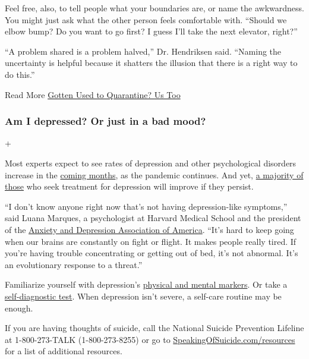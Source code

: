 Feel free, also, to tell people what your boundaries are, or name the
awkwardness. You might just ask what the other person feels comfortable
with. ``Should we elbow bump? Do you want to go first? I guess I'll take
the next elevator, right?''

``A problem shared is a problem halved,'' Dr. Hendriksen said. ``Naming
the uncertainty is helpful because it shatters the illusion that there
is a right way to do this.''

 Read More
\href{https://www.nytimes3xbfgragh.onion/2020/06/27/at-home/manage-your-coronavirus-anxiety.html}{Gotten
Used to Quarantine? Us Too}

\hypertarget{am-i-depressed-or-just-in-a-bad-mood}{%
\subsubsection{Am I depressed? Or just in a bad
mood?}\label{am-i-depressed-or-just-in-a-bad-mood}}

+

Most experts expect to see rates of depression and other psychological
disorders increase in the
\href{https://www.nytimes3xbfgragh.onion/2020/04/18/health/coronavirus-america-future.html}{coming
months}, as the pandemic continues. And yet,
\href{https://www.sciencedaily.com/releases/2015/03/150311160240.htm}{a
majority of those} who seek treatment for depression will improve if
they persist.

``I don't know anyone right now that's not having depression-like
symptoms,'' said Luana Marques, a psychologist at Harvard Medical School
and the president of the \href{https://adaa.org/}{Anxiety and Depression
Association of America}. ``It's hard to keep going when our brains are
constantly on fight or flight. It makes people really tired. If you're
having trouble concentrating or getting out of bed, it's not abnormal.
It's an evolutionary response to a threat.''

Familiarize yourself with depression's
\href{https://www.mayoclinic.org/diseases-conditions/depression/expert-answers/clinical-depression/faq-20057770}{physical
and mental markers}. Or take a
\href{https://www.med.umich.edu/1info/FHP/practiceguides/depress/phq-9.pdf}{self-diagnostic
test}. When depression isn't severe, a self-care routine may be enough.

If you are having thoughts of suicide, call the National Suicide
Prevention Lifeline at 1-800-273-TALK (1-800-273-8255) or go to
\href{http://speakingofsuicide.com/resources}{SpeakingOfSuicide.com/resources}
for a list of additional resources.

